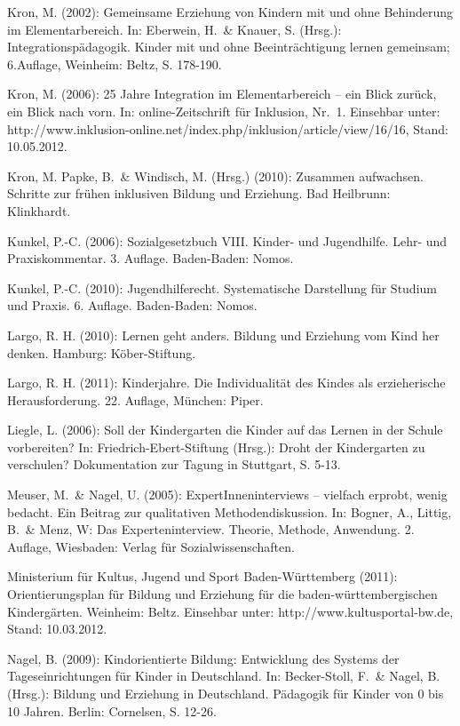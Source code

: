 Kron, M. (2002): Gemeinsame Erziehung von Kindern mit und ohne Behinderung im Elementarbereich. In: Eberwein, H.~\& Knauer, S. (Hrsg.): Integrationspädagogik. Kinder mit und ohne Beeinträchtigung lernen gemeinsam; 6.Auflage, Weinheim: Beltz, S. 178-190. 

Kron, M. (2006): 25 Jahre Integration im Elementarbereich – ein Blick zurück, ein Blick nach vorn. In: online-Zeitschrift für Inklusion, Nr.~1. Einsehbar unter: http://www.inklusion-online.net/index.php/inklusion/article/view/16/16, Stand: 10.05.2012.

Kron, M. Papke, B.~\& Windisch, M. (Hrsg.) (2010): Zusammen aufwachsen. Schritte zur frühen inklusiven Bildung und Erziehung. Bad Heilbrunn: Klinkhardt.

Kunkel, P.-C. (2006): Sozialgesetzbuch VIII. Kinder- und Jugendhilfe. Lehr- und Praxiskommentar. 3. Auflage. Baden-Baden: Nomos. 

Kunkel, P.-C. (2010): Jugendhilferecht. Systematische Darstellung für Studium und Praxis. 6. Auflage. Baden-Baden: Nomos. 

Largo, R. H. (2010): Lernen geht anders. Bildung und Erziehung vom Kind her denken. Hamburg: Köber-Stiftung. 

Largo, R. H. (2011): Kinderjahre. Die Individualität des Kindes als erzieherische Herausforderung. 22. Auflage, München: Piper.

Liegle, L. (2006): Soll der Kindergarten die Kinder auf das Lernen in der Schule vorbereiten? In: Friedrich-Ebert-Stiftung (Hrsg.): Droht der Kindergarten zu verschulen? Dokumentation zur Tagung in Stuttgart, S. 5-13.

Meuser, M.~\& Nagel, U. (2005): ExpertInneninterviews – vielfach erprobt, wenig bedacht. Ein Beitrag zur qualitativen Methodendiskussion. In: Bogner, A., Littig, B.~\& Menz, W: Das Experteninterview. Theorie, Methode, Anwendung. 2. Auflage, Wiesbaden: Verlag für Sozialwissenschaften.

Ministerium für Kultus, Jugend und Sport Baden-Württemberg (2011): Orientierungsplan für Bildung und Erziehung für die baden-württembergischen Kindergärten. Weinheim: Beltz. Einsehbar unter: http://www.kultusportal-bw.de, Stand: 10.03.2012.

Nagel, B. (2009): Kindorientierte Bildung: Entwicklung des Systems der Tageseinrichtungen für Kinder in Deutschland. In: Becker-Stoll, F.~\& Nagel, B. (Hrsg.): Bildung und Erziehung in Deutschland. Pädagogik für Kinder von 0 bis 10 Jahren. Berlin: Cornelsen, S. 12-26.

